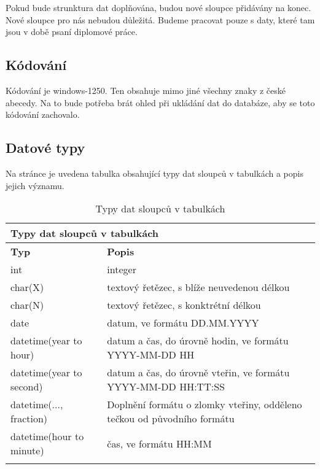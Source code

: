 Pokud bude strunktura dat doplňována, budou nové sloupce přidávány na konec. Nové sloupce pro nás nebudou důležitá. Budeme pracovat pouze s daty, které tam jsou v době psaní diplomové práce.

\subsection{Kódování}
Kódování je windows-1250. Ten obsahuje mimo jiné všechny znaky z české abecedy. Na to bude potřeba brát ohled při ukládání dat do databáze, aby se toto kódování zachovalo.

\subsection{Datové typy}
Na stránce je uvedena tabulka obsahující typy dat sloupců v tabulkách a popis jejich významu.

\begin{longtable}{|l|p{9cm}|} \hline
	\multicolumn{2}{|l|}{\textbf{Typy dat sloupců v tabulkách}} \\ \hline
	\textbf{Typ} & \textbf{Popis} \\ \hline
	
	int	& integer \\ \hline
	
	char(X)		& textový řetězec, s blíže neuvedenou délkou
	 \\ \hline
	
	char(N)		& textový řetězec, s konktrétní délkou
	 \\ \hline	
	
	date	& datum, ve formátu DD.MM.YYYY
	 \\ \hline	
	 
 	datetime(year to hour)		& datum a čas, do úrovně hodin, ve formátu YYYY-MM-DD HH
 	
	 \\ \hline
	 
 	datetime(year to second)		& datum a čas, do úrovně vteřin, ve formátu YYYY-MM-DD HH:TT:SS
 	
	 \\ \hline
	 
 	datetime(..., fraction)		& Doplnění formátu o zlomky vteřiny, odděleno tečkou od původního formátu
 	
	 \\ \hline
	 
 	datetime(hour to minute)		& čas, ve formátu HH:MM
	 \\ \hline
	
	\caption{Typy dat sloupců v tabulkách}
	\label{table:data_types}
\end{longtable}

